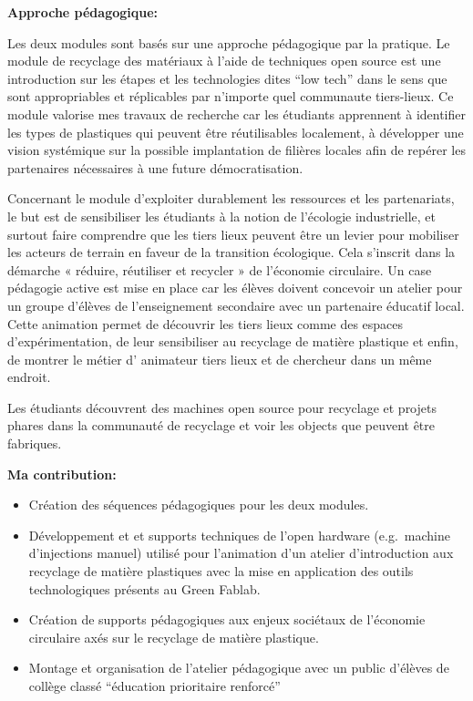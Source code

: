 \documentclass[
  11pt,
]{article}
\providecommand{\tightlist}{%
  \setlength{\itemsep}{0pt}\setlength{\parskip}{0pt}}\usepackage{longtable,booktabs,array}
\begin{document}
\textbf{Approche pédagogique: }

Les deux modules sont basés sur une approche pédagogique par la
pratique. Le module de recyclage des matériaux à l'aide de techniques
open source est une introduction sur les étapes et les technologies
dites ``low tech'' dans le sens que sont appropriables et réplicables
par n'importe quel communaute tiers-lieux. Ce module valorise mes
travaux de recherche car les étudiants apprennent à identifier les types
de plastiques qui peuvent être réutilisables localement, à développer
une vision systémique sur la possible implantation de filières locales
afin de repérer les partenaires nécessaires à une future
démocratisation.

Concernant le module d'exploiter durablement les ressources et les
partenariats, le but est de sensibiliser les étudiants à la notion de
l'écologie industrielle, et surtout faire comprendre que les tiers lieux
peuvent être un levier pour mobiliser les acteurs de terrain en faveur
de la transition écologique. Cela s'inscrit dans la démarche « réduire,
réutiliser et recycler » de l'économie circulaire. Un case pédagogie
active est mise en place car les élèves doivent concevoir un atelier
pour un groupe d'élèves de l'enseignement secondaire avec un partenaire
éducatif local. Cette animation permet de découvrir les tiers lieux
comme des espaces d'expérimentation, de leur sensibiliser au recyclage
de matière plastique et enfin, de montrer le métier d' animateur tiers
lieux et de chercheur dans un même endroit.

Les étudiants découvrent des machines open source pour recyclage et
projets phares dans la communauté de recyclage et voir les objects que
peuvent être fabriques.

\textbf{Ma contribution:}

\begin{itemize}
\tightlist
\item
  Création des séquences pédagogiques pour les deux modules.
\item
  Développement et et supports techniques de l'open hardware
  (e.g.~machine d'injections manuel) utilisé pour l'animation d'un
  atelier d'introduction aux recyclage de matière plastiques avec la
  mise en application des outils technologiques présents au Green
  Fablab.
\item
  Création de supports pédagogiques aux enjeux sociétaux de l'économie
  circulaire axés sur le recyclage de matière plastique.
\item
  Montage et organisation de l'atelier pédagogique avec un public
  d'élèves de collège classé ``éducation prioritaire renforcé''
\end{itemize}
\end{document}
